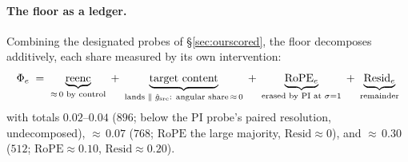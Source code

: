 \paragraph{The floor as a ledger.} Combining the designated probes of
\S\ref{sec:ourscored}, the floor decomposes additively, each share
measured by its own intervention:
\begin{equation*}
\Phi_e \;=\;
\underbrace{\mathrm{reenc}}_{{\approx}\,0 \text{ by control}}
\;+\; \underbrace{\text{target content}}_{\text{lands }\parallel\;
\hat g_{\mathrm{src}}\text{: angular share}\,{\approx}\,0}
\;+\; \underbrace{\mathrm{RoPE}_e}_{\text{erased by PI at }\sigma{=}1}
\;+\; \underbrace{\mathrm{Resid}_e}_{\text{remainder}}
\end{equation*}
with totals $0.02$--$0.04$ ($896$; below the PI probe's paired
resolution, undecomposed), ${\approx}\,0.07$ ($768$; $\mathrm{RoPE}$
the large majority, $\mathrm{Resid} \approx 0$), and ${\approx}\,0.30$
($512$; $\mathrm{RoPE} \approx 0.10$, $\mathrm{Resid} \approx 0.20$).

